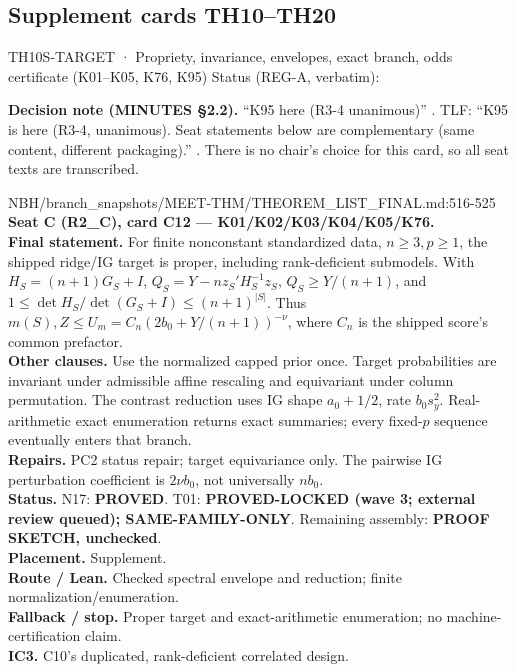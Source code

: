 \subsection{Supplement cards TH10--TH20}\label{sec:supp-cards}

\begin{card}{TH10}{S-TARGET · Propriety, invariance, envelopes, exact branch, odds certificate (K01–K05, K76, K95)}
\approvedFB\quad Status (REG-A, verbatim):  

\textbf{Decision note (MINUTES §2.2).} ``K95 here (R3-4 unanimous)'' . TLF: ``K95 is here (R3-4, unanimous). Seat statements below are complementary (same content, different packaging).'' . There is no chair's choice for this card, so all seat texts are transcribed.

\begin{stmt}{NBH/branch_snapshots/MEET-THM/THEOREM_LIST_FINAL.md:516-525}
\textbf{Seat C (R2\_C), card C12 — K01/K02/K03/K04/K05/K76.}\\
\textbf{Final statement.} For finite nonconstant standardized data, $n\ge3,p\ge1$, the shipped ridge/IG target is proper, including rank-deficient submodels. With $H_S=(n+1)G_S+I$, $Q_S=Y-nz_S'H_S^{-1}z_S$, $Q_S\ge Y/(n+1)$, and $1\le\det H_S/\det(G_S+I)\le(n+1)^{\lvert S\rvert}$. Thus $m(S),Z\le U_m=C_n(2b_0+Y/(n+1))^{-\nu}$, where $C_n$ is the shipped score’s common prefactor.\\
\textbf{Other clauses.} Use the normalized capped prior once. Target probabilities are invariant under admissible affine rescaling and equivariant under column permutation. The contrast reduction uses IG shape $a_0+1/2$, rate $b_0s_y^2$. Real-arithmetic exact enumeration returns exact summaries; every fixed-$p$ sequence eventually enters that branch.\\
\textbf{Repairs.} PC2 status repair; target equivariance only. The pairwise IG perturbation coefficient is $2\nu b_0$, not universally $nb_0$.\\
\textbf{Status.} N17: \textbf{PROVED}. T01: \textbf{PROVED-LOCKED (wave 3; external review queued); SAME-FAMILY-ONLY}. Remaining assembly: \textbf{PROOF SKETCH, unchecked}.\\
\textbf{Placement.} Supplement.\\
\textbf{Route / Lean.} Checked spectral envelope and reduction; finite normalization/enumeration.\\
\textbf{Fallback / stop.} Proper target and exact-arithmetic enumeration; no machine-certification claim.\\
\textbf{IC3.} C10’s duplicated, rank-deficient correlated design.
\end{stmt}


\end{card}
